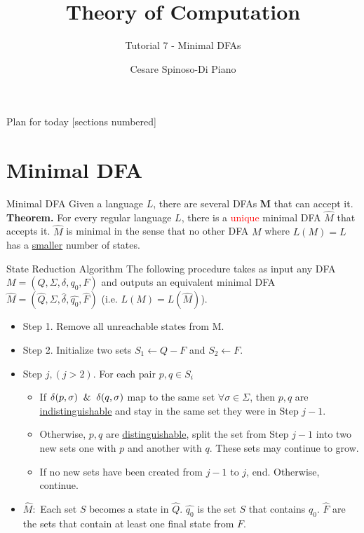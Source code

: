 \documentclass[10pt]{beamer}
\title{Theory of Computation}
\subtitle{Tutorial 7 - Minimal DFAs}
\author{Cesare Spinoso-Di Piano}
\date{}
\begin{document}
\maketitle

\begin{frame}{Plan for today}
    [sections numbered]
    \tableofcontents[hideallsubsections]
\end{frame}


\section{Minimal DFA}

\begin{frame}{Minimal DFA}
    Given a language $L$, there are several DFAs \textbf{M} that can accept it.\\ \bigskip
    \textbf{Theorem.} For every regular language $L$, there is a \textcolor{red}{unique} minimal DFA $\hat{M}$ that accepts it. $\hat{M}$ is minimal in the sense that no other DFA $M$ where $L(M) = L$ has a \underline{smaller} number of states.
\end{frame}

\begin{frame}[t]{State Reduction Algorithm}
    The following procedure takes as input any DFA $M = (Q, \Sigma, \delta, q_0, F)$ and outputs an equivalent minimal DFA $\hat{M} = (\hat{Q}, \Sigma, \hat{\delta}, \hat{q_0}, \hat{F})$ (i.e. $L(M) = L(\hat{M})$).
    \begin{itemize}
        \item Step 1. Remove all unreachable states from M.
        \item Step 2. Initialize two sets $S_1 \leftarrow Q - F$ and $S_2 \leftarrow F$.
        \item Step $j, (j > 2)$. For each pair $p, q \in S_i$
              \begin{itemize}
                  \item If $\delta(p, \sigma) \And \delta(q, \sigma)$ map to the same set $\forall \sigma \in \Sigma$, then $p,q$ are \underline{indistinguishable} and stay in the same set they were in Step $j-1$.
                  \item Otherwise, $p,q$ are \underline{distinguishable}, split the set from Step $j-1$ into two new sets one with $p$ and another with $q$. These sets may continue to grow.
                  \item If no new sets have been created from $j-1$ to $j$, end. Otherwise, continue.
              \end{itemize}
        \item $\hat{M}:$ Each set $S$ becomes a state in $\hat{Q}$. $\hat{q_0}$ is the set $S$ that contains $q_0$. $\hat{F}$ are the sets that contain at least one final state from $F$.
    \end{itemize}
\end{frame}
\end{document}
